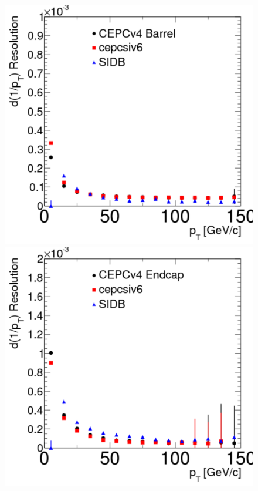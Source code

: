 \begin{figure}[hbtp]
\begin{center}
\includegraphics[width=0.25\textheight,keepaspectratio]{Figures/TrackingSystem/FullSilicon/Plot_muon_Pt_PtBarrel.pdf}
\includegraphics[width=0.25\textheight,keepaspectratio]{Figures/TrackingSystem/FullSilicon/Plot_muon_Pt_PtEndcap.pdf}

\end{center}
\end{figure}
